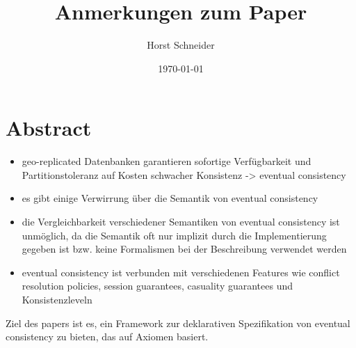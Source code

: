 \documentclass[11pt,a4paper,ngerman]{scrartcl}
\title{Anmerkungen zum Paper}
\author{Horst Schneider}
\date{\today{}}
\begin{document}
 
\maketitle 
\pagebreak
\tableofcontents
\section{Abstract}
\begin{itemize}
\item \Gls{geo-replicated} Datenbanken garantieren sofortige Verfügbarkeit und Partitionstoleranz auf Kosten schwacher Konsistenz -> \gls{eventual consistency}
\item es gibt einige Verwirrung über die Semantik von \gls{eventual consistency}
\item die Vergleichbarkeit verschiedener Semantiken von \gls{eventual consistency} ist unmöglich, da die Semantik oft nur implizit durch die Implementierung gegeben ist bzw. keine Formalismen bei der Beschreibung verwendet werden
\item \gls{eventual consistency} ist verbunden mit verschiedenen Features wie conflict resolution policies, session guarantees, casuality guarantees und Konsistenzleveln
\end{itemize}

\begin{framed}
Ziel des papers ist es, ein Framework zur deklarativen Spezifikation von \gls{eventual consistency} zu bieten, das auf Axiomen basiert.
\end{framed}
\end{document}
